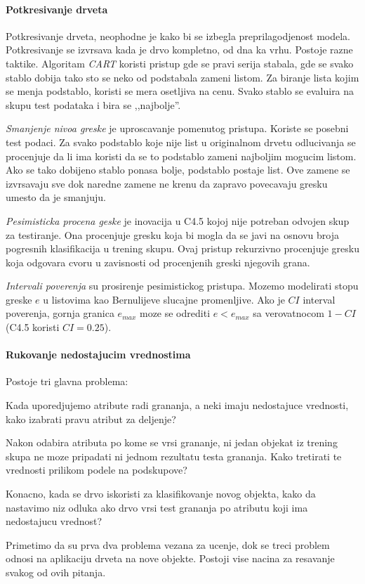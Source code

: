 \documentclass[a4paper]{article}
\begin{document}
\paragraph{Potkresivanje drveta} Potkresivanje drveta, neophodne je kako bi se izbegla
preprilagodjenost modela. Potkresivanje se izvrsava kada je drvo kompletno, od dna ka vrhu. Postoje
razne taktike. Algoritam \emph{CART} koristi pristup gde se pravi serija stabala, gde se svako
stablo dobija tako sto se neko od podstabala zameni listom. Za biranje lista kojim se menja
podstablo, koristi se mera osetljiva na cenu. Svako stablo se evaluira na skupu test podataka i bira
se ,,najbolje''.

\emph{Smanjenje nivoa greske} je uproscavanje pomenutog pristupa. Koriste se posebni test podaci. Za
svako podstablo koje nije list u originalnom drvetu odlucivanja se procenjuje da li ima koristi da
se to podstablo zameni najboljim mogucim listom. Ako se tako dobijeno stablo ponasa bolje, podstablo
postaje list. Ove zamene se izvrsavaju sve dok naredne zamene ne krenu da zapravo povecavaju gresku
umesto da je smanjuju.

\emph{Pesimisticka procena geske} je inovacija u C4.5 kojoj nije potreban odvojen skup za
testiranje. Ona procenjuje gresku koja bi mogla da se javi na osnovu broja pogresnih klasifikacija u
trening skupu. Ovaj pristup rekurzivno procenjuje gresku koja odgovara cvoru u zavisnosti od
procenjenih greski njegovih grana.

\emph{Intervali poverenja} su prosirenje pesimistickog pristupa. Mozemo modelirati stopu greske \(e\)
u listovima  kao Bernulijeve slucajne promenljive. Ako je \(CI\) interval poverenja, gornja granica
\(e_{max}\) moze se odrediti \(e < e_{max}\) sa verovatnocom \(1-CI\) (C4.5 koristi \(CI=0.25\)).

\paragraph{Rukovanje nedostajucim vrednostima} Postoje tri glavna problema:
\begin{enumerate*}[label=(\roman*)]
    \item Kada uporedjujemo atribute radi grananja, a neki imaju nedostajuce vrednosti, kako
        izabrati pravu atribut za deljenje?
    \item Nakon odabira atributa po kome se vrsi grananje, ni jedan objekat iz trening skupa ne moze
        pripadati ni jednom rezultatu testa grananja. Kako tretirati te vrednosti prilikom podele na
        podskupove?
    \item Konacno, kada se drvo iskoristi za klasifikovanje novog objekta, kako da nastavimo niz
        odluka ako drvo vrsi test grananja po atributu koji ima nedostajucu vrednost?
\end{enumerate*}
Primetimo da su prva dva problema vezana za ucenje, dok se treci problem odnosi na aplikaciju drveta
na nove objekte. Postoji vise nacina za resavanje svakog od ovih pitanja.
\end{document}
